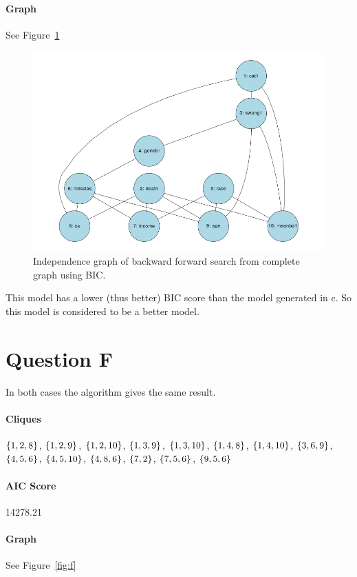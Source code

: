 \documentclass[12pt]{article}
\theoremstyle{definition}
\begin{document}
\paragraph{Graph} See Figure~\ref{fig:e}

\begin{figure}[H]
    \centering
    \includegraphics[width=0.8\linewidth]{e.png}
    \caption{Independence graph of backward forward search from complete graph using BIC.}
\label{fig:e}
\end{figure}

This model has a lower (thus better) BIC score than the model generated in c.
So this model is considered to be a better model.

\section*{Question F}
In both cases the algorithm gives the same result.

\paragraph{Cliques}
$\set{1,2,8}$, $\set{1,2,9}$, $\set{1,2,10}$, $\set{1,3,9}$, $\set{1,3,10}$, $\set{1,4,8}$,
$\set{1,4,10}$, $\set{3,6,9}$, $\set{4,5,6}$, $\set{4,5,10}$, $\set{4,8,6}$, $\set{7,2}$,
$\set{7,5,6}$, $\set{9,5,6}$

\paragraph{AIC Score} 14278.21

\paragraph{Graph} See Figure~\ref{fig:f}
\end{document}

